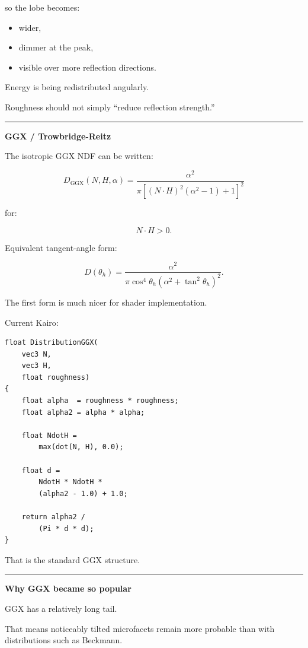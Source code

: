 so the lobe becomes:

\begin{itemize}
\tightlist
\item
  wider,
\item
  dimmer at the peak,
\item
  visible over more reflection directions.
\end{itemize}

Energy is being redistributed angularly.

Roughness should not simply ``reduce reflection strength.''

\begin{center}\rule{0.5\linewidth}{0.5pt}\end{center}

\textbf{GGX / Trowbridge-Reitz}

The isotropic GGX NDF can be written:

\[
\boxed{
D_{\mathrm{GGX}}(N,H,\alpha)
=
\frac{
\alpha^2
}{
\pi
\left[
(N\cdot H)^2(\alpha^2-1)+1
\right]^2
}
}
\]

for:

\[
N\cdot H>0.
\]

Equivalent tangent-angle form:

\[
D(\theta_h)
=
\frac{
\alpha^2
}{
\pi
\cos^4\theta_h
(\alpha^2+\tan^2\theta_h)^2
}.
\]

The first form is much nicer for shader implementation.

Current Kairo:

\begin{verbatim}
float DistributionGGX(
    vec3 N,
    vec3 H,
    float roughness)
{
    float alpha  = roughness * roughness;
    float alpha2 = alpha * alpha;

    float NdotH =
        max(dot(N, H), 0.0);

    float d =
        NdotH * NdotH *
        (alpha2 - 1.0) + 1.0;

    return alpha2 /
        (Pi * d * d);
}
\end{verbatim}

That is the standard GGX structure.

\begin{center}\rule{0.5\linewidth}{0.5pt}\end{center}

\textbf{Why GGX became so popular}

GGX has a relatively long tail.

That means noticeably tilted microfacets remain more probable than with distributions such as Beckmann.

